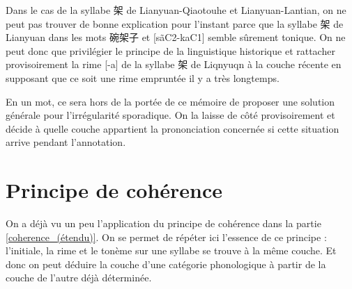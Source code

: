 \documentclass{scrbook}
\newcounter{c}[subsubsection]
\begin{document}
\begin{sloppypar}

Dans le cas de la syllabe 架 de Lianyuan-Qiaotouhe et Lianyuan-Lantian, on ne peut pas trouver de bonne explication pour l'instant parce que la syllabe 架 de Lianyuan dans les mots 碗架子 et [sãC2-kaC1] semble sûrement tonique. On ne peut donc que privilégier le principe de la linguistique historique et rattacher provisoirement la rime [-a] de la syllabe 架 de Liqnyuqn à la couche récente en supposant que ce soit une rime empruntée il y a très longtemps. %

En un mot, ce sera hors de la portée de ce mémoire de proposer une solution générale pour l'irrégularité sporadique. On la laisse de côté provisoirement et décide à quelle couche appartient la prononciation concernée si cette situation arrive pendant l'annotation. 

\section{Principe de cohérence}\label{coherence}
On a déjà vu un peu l'application du principe de cohérence dans la partie \ref{coherence_(étendu)}. On se permet de répéter ici l'essence de ce principe : l'initiale, la rime et le tonème sur une syllabe se trouve à la même couche. Et donc on peut déduire la couche d'une catégorie phonologique à partir de la couche de l'autre déjà déterminée.


\end{sloppypar}
\end{document}
